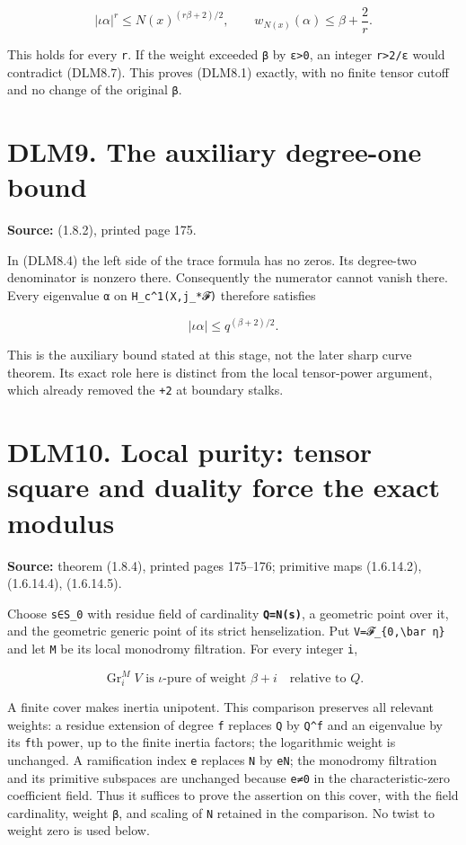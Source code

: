 \documentclass[
]{report}
\begin{document}
\[
|\iota\alpha|^r\le N(x)^{(r\beta+2)/2},
\qquad
w_{N(x)}(\alpha)\le\beta+\frac2r.
\tag{DLM8.7}
\]

This holds for every \texttt{r}. If the weight exceeded \texttt{β} by
\texttt{ε\textgreater{}0}, an integer \texttt{r\textgreater{}2/ε} would
contradict (DLM8.7). This proves (DLM8.1) exactly, with no finite tensor
cutoff and no change of the original \texttt{β}.

\section{DLM9. The auxiliary degree-one
bound}\label{dlm9.-the-auxiliary-degree-one-bound}

\textbf{Source:} (1.8.2), printed page 175.

In (DLM8.4) the left side of the trace formula has no zeros. Its
degree-two denominator is nonzero there. Consequently the numerator
cannot vanish there. Every eigenvalue \texttt{α} on
\texttt{H\_c\^{}1(X,j\_*𝓕)} therefore satisfies

\[
|\iota\alpha|\le q^{(\beta+2)/2}.
\tag{DLM9.1}
\]

This is the auxiliary bound stated at this stage, not the later sharp
curve theorem. Its exact role here is distinct from the local
tensor-power argument, which already removed the \texttt{+2} at boundary
stalks.

\section{DLM10. Local purity: tensor square and duality force the exact
modulus}\label{dlm10.-local-purity-tensor-square-and-duality-force-the-exact-modulus}

\textbf{Source:} theorem (1.8.4), printed pages 175--176; primitive maps
(1.6.14.2), (1.6.14.4), (1.6.14.5).

Choose \texttt{s∈S\_0} with residue field of cardinality
\textbf{\texttt{Q=N(s)}}, a geometric point over it, and the geometric
generic point of its strict henselization. Put
\texttt{V=𝓕\_\{0,\textbackslash{}bar\ η\}} and let \texttt{M} be its
local monodromy filtration. For every integer \texttt{i},

\[
\operatorname{Gr}_i^M V\text{ is }\iota\text{-pure of weight }\beta+i
\quad\text{relative to }Q.
\tag{DLM10.1}
\]

A finite cover makes inertia unipotent. This comparison preserves all
relevant weights: a residue extension of degree \texttt{f} replaces
\texttt{Q} by \texttt{Q\^{}f} and an eigenvalue by its \texttt{f}th
power, up to the finite inertia factors; the logarithmic weight is
unchanged. A ramification index \texttt{e} replaces \texttt{N} by
\texttt{eN}; the monodromy filtration and its primitive subspaces are
unchanged because \texttt{e≠0} in the characteristic-zero coefficient
field. Thus it suffices to prove the assertion on this cover, with the
field cardinality, weight \texttt{β}, and scaling of \texttt{N} retained
in the comparison. No twist to weight zero is used below.
\end{document}
